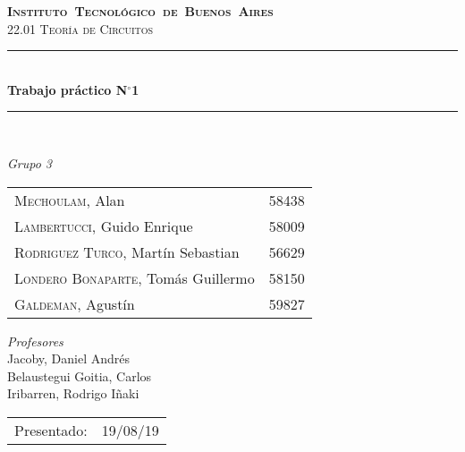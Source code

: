 \begin{titlepage}
\newcommand{\HRule}{\rule{\linewidth}{0.5mm}}
\center
\mbox{\textsc{\LARGE \bfseries {Instituto Tecnológico de Buenos Aires}}}\\[1.5cm]
\textsc{\Large 22.01 Teoría de Circuitos}\\[0.5cm]


\HRule \\[0.6cm]
{ \Huge \bfseries Trabajo práctico N$^{\circ}$1}\\[0.4cm] 
\HRule \\[1.5cm]


{\large

\emph{Grupo 3}\\
\vspace{3px}

\begin{tabular}{lr} 	
\textsc{Mechoulam}, Alan  &  58438\\
\textsc{Lambertucci}, Guido Enrique  & 58009 \\
\textsc{Rodriguez Turco}, Martín Sebastian  & 56629 \\
\textsc{Londero Bonaparte}, Tomás Guillermo  & 58150 \\
\textsc{Galdeman}, Agustín & 59827\\
\end{tabular}

\vspace{20px}

\emph{Profesores}\\
Jacoby, Daniel Andrés\\
Belaustegui Goitia, Carlos\\
Iribarren, Rodrigo Iñaki\\
\vspace{3px}

\vspace{100px}

\begin{tabular}{ll}

Presentado: & 19/08/19\\

\end{tabular}

}

\vfill

\end{titlepage}
